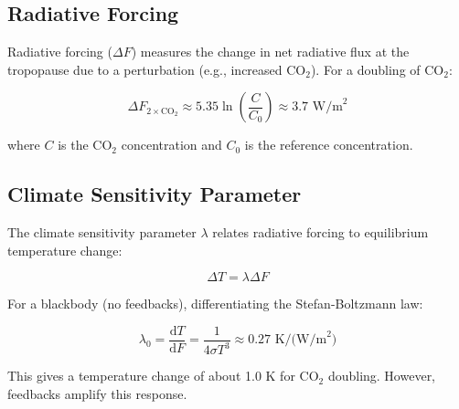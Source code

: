 \documentclass[11pt,a4paper]{article}
\newcommand{\dd}{\mathrm{d}}
\begin{document}
\subsection{Radiative Forcing}

Radiative forcing ($\Delta F$) measures the change in net radiative flux at the tropopause due to a perturbation (e.g., increased CO$_2$). For a doubling of CO$_2$:

\begin{equation}
\Delta F_{2\times\text{CO}_2} \approx 5.35 \ln\left(\frac{C}{C_0}\right) \approx 3.7 \text{ W/m}^2
\label{eq:forcing}
\end{equation}

where $C$ is the CO$_2$ concentration and $C_0$ is the reference concentration.

\subsection{Climate Sensitivity Parameter}

The climate sensitivity parameter $\lambda$ relates radiative forcing to equilibrium temperature change:

\begin{equation}
\Delta T = \lambda \Delta F
\label{eq:sensitivity}
\end{equation}

For a blackbody (no feedbacks), differentiating the Stefan-Boltzmann law:

\begin{equation}
\lambda_0 = \frac{\dd T}{\dd F} = \frac{1}{4\sigma T^3} \approx 0.27 \text{ K/(W/m}^2)
\end{equation}

This gives a temperature change of about 1.0 K for CO$_2$ doubling. However, feedbacks amplify this response.
\end{document}
